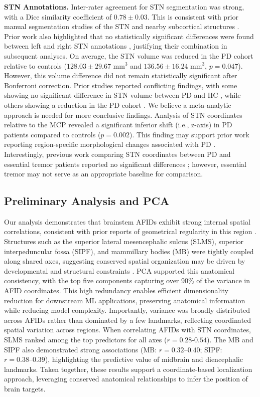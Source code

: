 \newpage
\textbf{STN Annotations.} Inter-rater agreement for STN segmentation was strong, with a Dice similarity coefficient of \( 0.78 \pm 0.03 \). This is consistent with prior manual segmentation studies of the STN and nearby subcortical structures \cite{Camlidag2014-za,Miller2023-ct}. Prior work also highlighted that no statistically significant differences were found between left and right STN annotations \cite{Duchin2018-sv, Miller2023-ct}, justifying their combination in subsequent analyses. On average, the STN volume was reduced in the PD cohort relative to controls (\( 128.03 \pm 29.67 \text{ mm}^3 \) and \( 136.56 \pm 16.24 \text{ mm}^3 \), \( p = 0.047 \)). However, this volume difference did not remain statistically significant after Bonferroni correction. Prior studies reported conflicting findings, with some showing no significant difference in STN volume between PD and HC \cite{Alkemade2017-tt, Camlidag2014-za}, while others showing a reduction in the PD cohort \cite{Colpan2010-up, Patriat2020-cm}. We believe a meta-analytic approach is needed for more conclusive findings. Analysis of STN coordinates relative to the MCP revealed a significant inferior shift (i.e., z-axis) in PD patients compared to controls (\( p = 0.002 \)). This finding may support prior work reporting region-specific morphological changes associated with PD \cite{Kaya2019-wa}. Interestingly, previous work comparing STN coordinates between PD and essential tremor patients reported no significant differences \cite{Duchin2018-sv}; however, essential tremor may not serve as an appropriate baseline for comparison.

\subsection{Preliminary Analysis and PCA}
Our analysis demonstrates that brainstem AFIDs exhibit strong internal spatial correlations, consistent with prior reports of geometrical regularity in this region \cite{Perera2024-lq}. Structures such as the superior lateral mesencephalic sulcus (SLMS), superior interpeduncular fossa (SIPF), and mammillary bodies (MB) were tightly coupled along shared axes, suggesting conserved spatial organization may be driven by developmental and structural constraints \cite{Parraga2016-bl}. PCA supported this anatomical consistency, with the top five components capturing over 90\% of the variance in AFID coordinates. This high redundancy enables efficient dimensionality reduction for downstream ML applications, preserving anatomical information while reducing model complexity. Importantly, variance was broadly distributed across AFIDs rather than dominated by a few landmarks, reflecting coordinated spatial variation across regions. When correlating AFIDs with STN coordinates, SLMS ranked among the top predictors for all axes (\( r = 0.28\text{-}0.54 \)). The MB and SIPF also demonstrated strong associations (MB: \( r = 0.32\text{--}0.40 \); SIPF: \( r = 0.38\text{--}0.39 \)), highlighting the predictive value of midbrain and diencephalic landmarks. Taken together, these results support a coordinate-based localization approach, leveraging conserved anatomical relationships to infer the position of brain targets.

